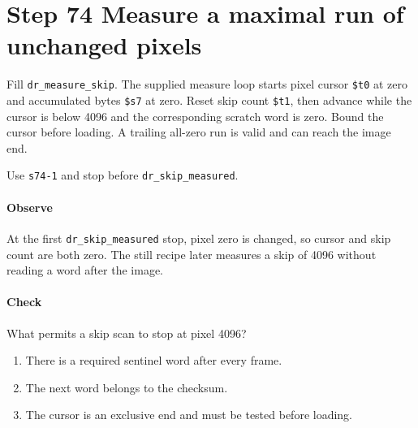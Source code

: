 \section{Step 74 Measure a maximal run of unchanged pixels}
Fill \texttt{dr\_measure\_skip}. The supplied measure loop starts pixel cursor \texttt{\$t0} at zero and accumulated bytes \texttt{\$s7} at zero. Reset skip count \texttt{\$t1}, then advance while the cursor is below 4096 and the corresponding scratch word is zero. Bound the cursor before loading. A trailing all-zero run is valid and can reach the image end.

Use \texttt{s74-1} and stop before \texttt{dr\_skip\_measured}.

\paragraph{Observe} At the first \texttt{dr\_skip\_measured} stop, pixel zero is changed, so cursor and skip count are both zero. The still recipe later measures a skip of 4096 without reading a word after the image.

\paragraph{Check} What permits a skip scan to stop at pixel 4096?
\begin{enumerate}[label=\Alph*.]
\item There is a required sentinel word after every frame.
\item The next word belongs to the checksum.
\item The cursor is an exclusive end and must be tested before loading.
\end{enumerate}
